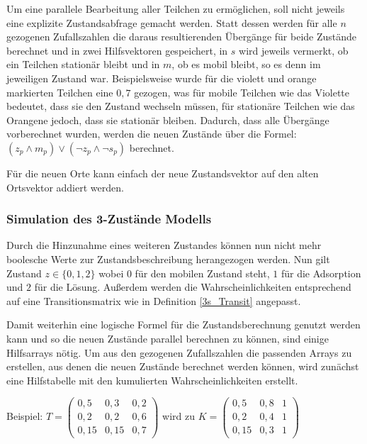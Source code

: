 Um eine parallele Bearbeitung aller Teilchen zu ermöglichen, soll nicht jeweils eine explizite Zustandsabfrage gemacht werden. Statt dessen werden für alle $n$ gezogenen Zufallszahlen die daraus resultierenden Übergänge für beide Zustände berechnet und in zwei Hilfsvektoren gespeichert, in $s$ wird jeweils vermerkt, ob ein Teilchen stationär bleibt und in $m$, ob es mobil bleibt, so es denn im jeweiligen Zustand war. Beispielsweise wurde für die violett und orange markierten Teilchen eine $0,7$ gezogen, was für mobile Teilchen wie das Violette bedeutet, dass sie den Zustand wechseln müssen, für stationäre Teilchen wie das Orangene jedoch, dass sie stationär bleiben. 
Dadurch, dass alle Übergänge vorberechnet wurden, werden die neuen Zustände über die Formel: $(z_p \land m_p) \lor (\lnot z_p \land \lnot s_p)$ berechnet. 

Für die neuen Orte kann einfach der neue Zustandsvektor auf den alten Ortsvektor addiert werden.


\subsubsection{Simulation des 3-Zustände Modells}

Durch die Hinzunahme eines weiteren Zustandes können nun nicht mehr boolesche Werte zur Zustandsbeschreibung herangezogen werden. Nun gilt Zustand $z \in \{0, 1, 2\}$  wobei $0$ für den mobilen Zustand steht, $1$ für die Adsorption und $2$ für die Lösung. Außerdem werden die Wahrscheinlichkeiten entsprechend auf eine Transitionsmatrix wie in Definition \ref{3s_Transit} angepasst.

Damit weiterhin eine logische Formel für die Zustandsberechnung genutzt werden kann und so die neuen Zustände parallel berechnen zu können, sind einige Hilfsarrays nötig.%
Um aus den gezogenen Zufallszahlen die passenden Arrays zu erstellen, aus denen die neuen Zustände berechnet werden können, wird zunächst eine Hilfstabelle mit den kumulierten Wahrscheinlichkeiten erstellt. %

Beispiel:
$T= 
\begin{pmatrix}
0,5 & 0,3 & 0,2 \\
0,2 & 0,2 & 0,6 \\
0,15 & 0,15 & 0,7 
\end{pmatrix}
$  wird zu 
$K= 
\begin{pmatrix}
0,5 & 0,8 & 1 \\
0,2 & 0,4 & 1 \\
0,15 & 0,3 & 1 
\end{pmatrix}
$ 

